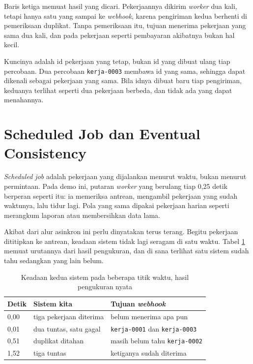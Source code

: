 Baris ketiga memuat hasil yang dicari. Pekerjaannya dikirim \textit{worker}
dua kali, tetapi hanya satu yang sampai ke \textit{webhook}, karena
pengiriman kedua berhenti di pemeriksaan duplikat. Tanpa pemeriksaan itu,
tujuan menerima pekerjaan yang sama dua kali, dan pada pekerjaan seperti
pembayaran akibatnya bukan hal kecil.

Kuncinya adalah id pekerjaan yang tetap, bukan id yang dibuat ulang tiap
percobaan. Dua percobaan \texttt{kerja-0003} membawa id yang sama, sehingga
dapat dikenali sebagai pekerjaan yang sama. Bila idnya dibuat baru tiap
pengiriman, keduanya terlihat seperti dua pekerjaan berbeda, dan tidak ada
yang dapat menahannya.

\section{Scheduled Job dan Eventual Consistency}

\textit{Scheduled job} adalah pekerjaan yang dijalankan menurut waktu, bukan
menurut permintaan. Pada demo ini, putaran \textit{worker} yang berulang tiap
0,25 detik berperan seperti itu: ia memeriksa antrean, mengambil pekerjaan
yang sudah waktunya, lalu tidur lagi. Pola yang sama dipakai pekerjaan harian
seperti merangkum laporan atau membersihkan data lama.

Akibat dari alur asinkron ini perlu dinyatakan terus terang. Begitu pekerjaan
dititipkan ke antrean, keadaan sistem tidak lagi seragam di satu waktu. Tabel
\ref{tab:konsisten} memuat urutannya dari hasil pengukuran, dan di sana
terlihat satu sistem sudah tahu sedangkan yang lain belum.

\begin{table}[!htb]
  \centering
  \caption{Keadaan kedua sistem pada beberapa titik waktu, hasil pengukuran
           nyata}
  \label{tab:konsisten}
  \begin{tabularx}{\textwidth}{lXX}
    \hline
    \textbf{Detik} & \textbf{Sistem kita} & \textbf{Tujuan \textit{webhook}} \\
    \hline
    0,00 & tiga pekerjaan diterima & belum menerima apa pun \\
    \hline
    0,01 & dua tuntas, satu gagal & \texttt{kerja-0001} dan \texttt{kerja-0003} \\
    \hline
    0,51 & duplikat ditahan & masih belum tahu \texttt{kerja-0002} \\
    \hline
    1,52 & tiga tuntas & ketiganya sudah diterima \\
    \hline
  \end{tabularx}
\end{table}

